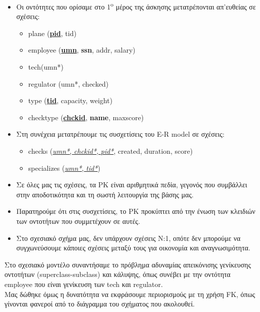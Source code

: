 \documentclass[a4paper]{article}
\begin{document}
\begin{itemize}
\item Οι οντότητες που ορίσαμε στο 1\textsuperscript{o} μέρος της άσκησης
μετατρέπονται απ'ευθείας σε σχέσεις:
\begin{itemize}
\item plane (\underline{\textbf{pid}}, tid)
\item employee (\underline{\textbf{umn}}, \textbf{ssn}, addr, salary)
\tab \item tech(umn*)
\tab \item regulator (umn*, checked)
\item type (\underline{\textbf{tid}}, capacity, weight)
\item checktype (\underline{\textbf{chckid}}, \textbf{name}, maxscore)\\
\end{itemize}

\item Στη συνέχεια μετατρέπουμε τις συσχετίσεις του E-R model σε σχέσεις:
\begin{itemize}
\item checks (\underline{\textit{umn*}, \textit{chckid*}, \textit{pid*}}, created,
duration, score)
\item specializes (\underline{\textit{umn*}, \textit{tid*}})\\

\end{itemize}
\end{itemize}

\begin{itemize}
\renewcommand{\labelitemi}{$\diamondsuit$}
\item Σε όλες μας τις σχέσεις, τα PK είναι αριθμητικά πεδία, γεγονός που
συμβάλλει στην αποδοτικότητα και τη σωστή λειτουργία της βάσης μας.
\item Παρατηρούμε ότι στις συσχετίσεις, το PK προκύπτει από την ένωση των
κλειδιών των οντοτήτων που συμμετέχουν σε αυτές.
\item Στο σχεσιακό σχήμα μας, δεν υπάρχουν σχέσεις Ν:1, οπότε δεν μπορούμε να
συγχωνεύσουμε κάποιες σχέσεις μεταξύ τους για οικονομία και αναγνωσιμότητα.\\
\renewcommand{\labelitemi}{$\bullet$}
\end{itemize}

Στο σχεσιακό μοντέλο συναντήσαμε το πρόβλημα αδυναμίας απεικόνισης
γενίκευσης οντοτήτων (superclass-subclass) και κάλυψης, όπως συνέβει με την
οντότητα employee που είναι γενίκευση των tech και regulator.\\
Μας δώθηκε όμως η δυνατότητα να εκφράσουμε περιορισμούς με τη χρήση FK, όπως
γίνονται φανεροί από το διάγραμμα του σχήματος που ακολουθεί.\\
\end{document}
